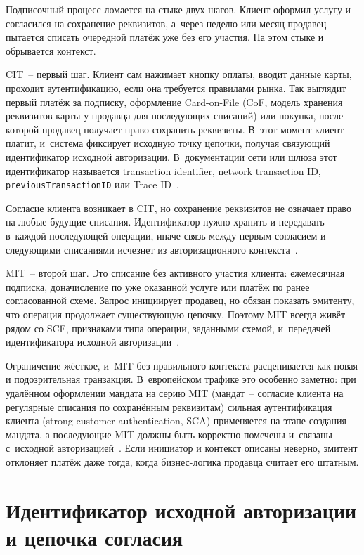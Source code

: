 Подписочный процесс ломается на стыке двух шагов. Клиент
оформил услугу и согласился на сохранение реквизитов, а~через
неделю или месяц продавец пытается списать очередной платёж уже
без его участия. На этом стыке и обрывается контекст.

CIT~-- первый шаг. Клиент сам нажимает кнопку оплаты,
вводит данные карты, проходит аутентификацию, если она требуется
правилами рынка. Так выглядит первый платёж за подписку, оформление
Card-on-File (CoF, модель хранения реквизитов карты у продавца для
последующих списаний) или покупка, после которой продавец получает право
сохранить реквизиты. В~этот момент клиент платит, и~система фиксирует
исходную точку цепочки, получая связующий идентификатор исходной
авторизации. В~документации сети или шлюза этот идентификатор называется
transaction identifier, network transaction ID,
\texttt{previousTransactionID} или Trace ID~\cite{mc-tpr,cybs-initial-transactions,cybs-mc-subscription-mit}.

Согласие клиента возникает в CIT, но сохранение реквизитов
не означает право на любые будущие списания. Идентификатор нужно
хранить и передавать в~каждой последующей операции, иначе связь
между первым согласием и следующими списаниями исчезнет из
авторизационного контекста~\cite{mc-tpr,cybs-initial-transactions}.

MIT~-- второй шаг. Это списание без активного участия клиента:
ежемесячная подписка, доначисление по уже оказанной услуге или
платёж по ранее согласованной схеме. Запрос инициирует продавец,
но обязан показать эмитенту, что операция продолжает существующую
цепочку. Поэтому MIT всегда живёт рядом со SCF, признаками типа операции,
заданными схемой, и~передачей идентификатора исходной
авторизации~\cite{mc-tpr,cybs-mc-subscription-mit}.

Ограничение жёсткое, и~MIT без правильного контекста расценивается
как новая и подозрительная транзакция. В~европейском трафике это
особенно заметно: при удалённом оформлении мандата на серию MIT
(мандат~-- согласие клиента на регулярные списания по сохранённым реквизитам)
сильная аутентификация клиента (strong customer authentication, SCA)
применяется на этапе создания мандата, а последующие MIT должны быть
корректно помечены и~связаны с~исходной
авторизацией~\cite{eba-mit-qa,mc-tpr}. Если инициатор и контекст
описаны неверно, эмитент отклоняет платёж даже тогда, когда
бизнес-логика продавца считает его штатным.

\section{Идентификатор исходной авторизации и цепочка согласия}\label{sec:subscriptions-ntid}

